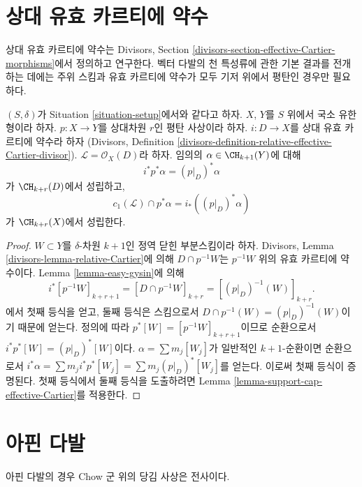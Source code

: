 \section{상대 유효 카르티에 약수}
\label{section-relative-effective-cartier}

\noindent
상대 유효 카르티에 약수는 Divisors, Section
\ref{divisors-section-effective-Cartier-morphisms}에서 정의하고 연구한다.
벡터 다발의 천 특성류에 관한 기본 결과를 전개하는 데에는 주위 스킴과
유효 카르티에 약수가 모두 기저 위에서 평탄인 경우만 필요하다.

\begin{lemma}
\label{lemma-relative-effective-cartier}
$(S, \delta)$가 Situation \ref{situation-setup}에서와 같다고 하자.
$X$, $Y$를 $S$ 위에서 국소 유한형이라 하자.
$p : X \to Y$를 상대차원 $r$인 평탄 사상이라 하자.
$i : D \to X$를 상대 유효 카르티에 약수라 하자
(Divisors, Definition
\ref{divisors-definition-relative-effective-Cartier-divisor}).
$\mathcal{L} = \mathcal{O}_X(D)$라 하자.
임의의 $\alpha \in \CH_{k + 1}(Y)$에 대해
$$
i^*p^*\alpha = (p|_D)^*\alpha
$$
가 $\CH_{k + r}(D)$에서 성립하고,
$$
c_1(\mathcal{L}) \cap p^*\alpha = i_* ((p|_D)^*\alpha)
$$
가 $\CH_{k + r}(X)$에서 성립한다.
\end{lemma}

\begin{proof}
$W \subset Y$를 $\delta$-차원 $k + 1$인 정역 닫힌 부분스킴이라 하자.
Divisors, Lemma \ref{divisors-lemma-relative-Cartier}에 의해
$D \cap p^{-1}W$는 $p^{-1}W$ 위의 유효 카르티에 약수이다. Lemma
\ref{lemma-easy-gysin}에 의해
$$
i^*[p^{-1}W]_{k + r + 1} =
[D \cap p^{-1}W]_{k + r} =
[(p|_D)^{-1}(W)]_{k + r}.
$$
에서 첫째 등식을 얻고, 둘째 등식은 스킴으로서
$D \cap p^{-1}(W) = (p|_D)^{-1}(W)$이기 때문에 얻는다.
정의에 따라 $p^*[W] = [p^{-1}W]_{k + r + 1}$이므로 순환으로서
$i^*p^*[W] = (p|_D)^*[W]$이다. $\alpha = \sum m_j[W_j]$가 일반적인
$k + 1$-순환이면 순환으로서
$i^*\alpha = \sum m_j i^*p^*[W_j] = \sum m_j(p|_D)^*[W_j]$를 얻는다.
이로써 첫째 등식이 증명된다. 첫째 등식에서 둘째 등식을 도출하려면
Lemma \ref{lemma-support-cap-effective-Cartier}를 적용한다.
\end{proof}








\section{아핀 다발}
\label{section-affine-vector}

\noindent
아핀 다발의 경우 Chow 군 위의 당김 사상은 전사이다.

